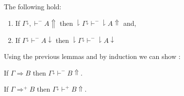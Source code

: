 \begin{lemma}
The following hold:
\begin{enumerate}
		\item If $\Gamma^\downarrow,\vdash^{-}  A\Uparrow$ then $\downharpoonright\Gamma^\downarrow\vdash^{-} \downharpoonright A\Uparrow$   and,
		\item If $\Gamma^\downarrow\vdash^{-} A\downarrow$ then  $\downharpoonright\Gamma^\downarrow\vdash^{-} \downharpoonright A\downarrow$   
	\end{enumerate}
\end{lemma}
Using the previous lemmas and by induction we can show :
\begin{theorem} 
	\label{soundnseq}
If   $\Gamma\Rightarrow B$ then $\Gamma^\downarrow\vdash^{-} B\Uparrow$.

	
\end{theorem}
\begin{theorem} 
	
	If   $\Gamma\Rightarrow^{+} B$ then $\Gamma^\downarrow\vdash^{+} B\Uparrow$.
\end{theorem}


